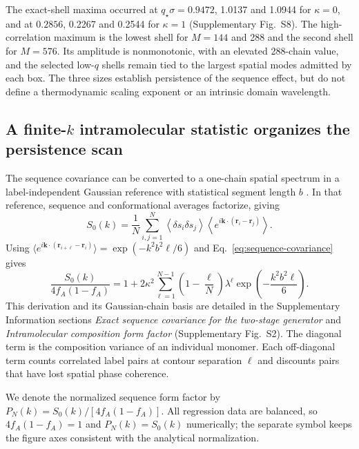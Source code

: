 \documentclass[pdflatex,sn-nature,onecolumn]{sn-jnl}
\begin{document}
The exact-shell maxima occurred at $q_\star\sigma=0.9472$, 1.0137 and 1.0944 for $\kappa=0$, and at $0.2856$, 0.2267 and 0.2544 for $\kappa=1$ (Supplementary Fig.~S8). The high-correlation maximum is the lowest shell for $M=144$ and 288 and the second shell for $M=576$. Its amplitude is nonmonotonic, with an elevated 288-chain value, and the selected low-$q$ shells remain tied to the largest spatial modes admitted by each box. The three sizes establish persistence of the sequence effect, but do not define a thermodynamic scaling exponent or an intrinsic domain wavelength.

\subsection{A finite-\texorpdfstring{$k$}{k} intramolecular statistic organizes the persistence scan}

The sequence covariance can be converted to a one-chain spatial spectrum in a label-independent Gaussian reference with statistical segment length $b$ \cite{RubinsteinColby2003}. In that reference, sequence and conformational averages factorize, giving
\begin{equation}
S_0(k)=\frac{1}{N}\sum_{i,j=1}^{N}
\left\langle\delta s_i\delta s_j\right\rangle
\left\langle e^{i\bm{k}\cdot(\bm{r}_i-\bm{r}_j)}\right\rangle.
\label{eq:s0-definition}
\end{equation}
Using $\langle e^{i\bm{k}\cdot(\bm{r}_{i+\ell}-\bm{r}_i)}\rangle=\exp(-k^2b^2\ell/6)$ and Eq.~\ref{eq:sequence-covariance} gives
\begin{equation}
\frac{S_0(k)}{4f_A(1-f_A)}=
1+2\kappa^2\sum_{\ell=1}^{N-1}
\left(1-\frac{\ell}{N}\right)\lambda^\ell
\exp\!\left(-\frac{k^2b^2\ell}{6}\right).
\label{eq:finite-form-factor}
\end{equation}
This derivation and its Gaussian-chain basis are detailed in the Supplementary Information sections \emph{Exact sequence covariance for the two-stage generator} and \emph{Intramolecular composition form factor} (Supplementary Fig.~S2). The diagonal term is the composition variance of an individual monomer. Each off-diagonal term counts correlated label pairs at contour separation $\ell$ and discounts pairs that have lost spatial phase coherence.

We denote the normalized sequence form factor by $P_N(k)=S_0(k)/[4f_A(1-f_A)]$. All regression data are balanced, so $4f_A(1-f_A)=1$ and $P_N(k)=S_0(k)$ numerically; the separate symbol keeps the figure axes consistent with the analytical normalization.
\end{document}
